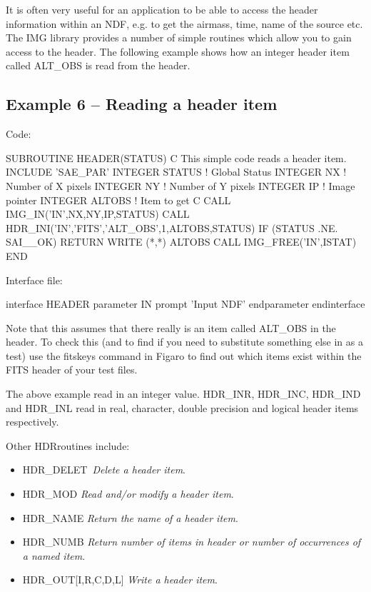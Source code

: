 \documentclass[11pt,nolof]{starlink}
\begin{document}
It is often very useful for an application to be able to access the header
information within an NDF, e.g. to get the airmass, time, name of the
source etc. The IMG library provides a number of simple routines which
allow you to gain access to the header. The following example shows how an
integer header item called \textsf{ALT\_OBS} is read from the header.

\subsection{Example 6 -- Reading a header item}

Code:

 \begin{small}
\begin{terminalv}
        SUBROUTINE HEADER(STATUS)
C This simple code reads a header item.
        INCLUDE 'SAE_PAR'
        INTEGER STATUS     ! Global Status
        INTEGER NX         ! Number of X pixels
        INTEGER NY         ! Number of Y pixels
        INTEGER IP         ! Image pointer
        INTEGER ALTOBS     ! Item to get
C
        CALL IMG_IN('IN',NX,NY,IP,STATUS)
        CALL HDR_INI('IN','FITS','ALT_OBS',1,ALTOBS,STATUS)
        IF (STATUS .NE. SAI__OK) RETURN
        WRITE (*,*) ALTOBS
        CALL IMG_FREE('IN',ISTAT)
        END
\end{terminalv}
\end{small}

Interface file:

\begin{small}
\begin{terminalv}
interface HEADER
  parameter IN
  prompt 'Input NDF'
  endparameter
endinterface
\end{terminalv}
\end{small}

Note that this assumes that there really is an item called \textsf{ALT\_OBS}
in the header. To check this (and to find if you need to substitute
something else in as a test) use the \textsf{fitskeys} command in \textsf{Figaro} to find out which items exist within the FITS header of your test
files.

The above example read in an integer value.  \textsf{HDR\_INR}, \textsf{HDR\_INC}, \textsf{HDR\_IND} and \textsf{HDR\_INL} read in real, character,
double precision and logical header items respectively.

Other \textsf{HDR}routines include:

\begin{itemize}
\item \textsf{HDR\_DELET}\ \emph{Delete a header item}.
\item \textsf{HDR\_MOD} \emph{Read and/or modify a header item}.
\item \textsf{HDR\_NAME} \emph{Return the name of a header item}.
\item \textsf{HDR\_NUMB} \emph{Return number of items in header or
number of occurrences of a named item}.
\item \textsf{HDR\_OUT[I,R,C,D,L]} \emph{Write a header item}.
\end{itemize}
\end{document}

